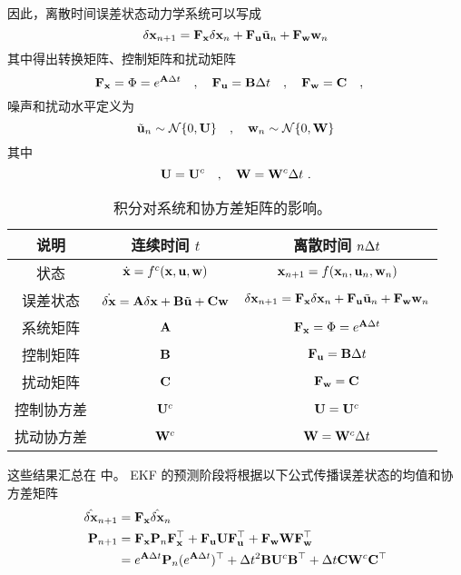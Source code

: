 %
因此，离散时间误差状态动力学系统可以写成
%
\begin{equation}
\delta{\bf x}_{n+1} = {\bf F}_{\bf x}\delta{\bf x}_n + {\bf F}_{\bf u}\tilde{{\bf u}}_n + {\bf F}_{\bf w} {\bf w}_n \label{equ:discTime}
\end{equation}
%
其中得出转换矩阵、控制矩阵和扰动矩阵
%
\begin{equation}
{\bf F}_{\bf x}=\Phi = e^{{\bf A}\Delta t} \quad , \quad {\bf F}_{\bf u}={\bf B}\Delta t \quad , \quad {\bf F}_{\bf w} = {\bf C} \quad , \quad 
\end{equation}
%
噪声和扰动水平定义为
%
\begin{equation}
\tilde{{\bf u}}_n\sim\mathcal{N}\{0,{\bf U}\} \quad , \quad {\bf w}_n\sim\mathcal{N}\{0,{\bf W}\} \label{equ:discMat}
\end{equation}
%
其中 
%
\begin{equation}
{\bf U} = {\bf U}^c \quad , \quad {\bf W} = {\bf W}^c\Delta t~. \label{equ:discCov}
\end{equation}
%
\begin{table*}
\renewcommand{\arraystretch}{1.3}
\caption{积分对系统和协方差矩阵的影响。}
\centering
\vspace{1ex}
\begin{tabular}{|c|c|c|}
\hline
说明 & 连续时间 $t$ & 离散时间 $n\Delta t$\\
\hline
\hline
状态 & $\dot{{\bf x}}=f^c({\bf x},{\bf u},{\bf w})$ & ${\bf x}_{n+1} = f({\bf x}_n,{\bf u}_n,{\bf w}_n)$ \\
误差状态 & $\dot{\delta{\bf x}}={\bf A}\delta{\bf x}+{\bf B}\tilde{{\bf u}}+{\bf C}{\bf w}$ & $\delta{\bf x}_{n+1}={\bf F}_{\bf x}\delta{\bf x}_n+{\bf F}_{\bf u}\tilde{{\bf u}}_n+{\bf F}_{\bf w}{\bf w}_n$ \\
\hline
系统矩阵 & ${\bf A}$ & ${\bf F}_{\bf x}=\Phi=e^{{\bf A}\Delta t}$ \\
控制矩阵 & ${\bf B}$ & ${\bf F}_{\bf u}={\bf B}\Delta t$ \\
扰动矩阵 & ${\bf C}$ & ${\bf F}_{\bf w}={\bf C}$ \\
\hline
控制协方差 & ${\bf U}^c$ & ${\bf U}={\bf U}^c$  \\
扰动协方差 & ${\bf W}^c$ & ${\bf W}={\bf W}^c\Delta t$  \\
\hline
\end{tabular}
\label{tab:IntEffects}
\end{table*}%

这些结果汇总在  中。
EKF 的预测阶段将根据以下公式传播误差状态的均值和协方差矩阵
%
\begin{align}
\hat{\delta{\bf x}}_{n+1} &= {\bf F}_{\bf x} \hat{\delta{\bf x}}_n \\
{\bf P}_{n+1} &= {\bf F}_{\bf x}{\bf P}_n{\bf F}_{\bf x}^{\top} + {\bf F}_{\bf u}{\bf U}{\bf F}_{\bf u}^{\top} + {\bf F}_{\bf w}{\bf W}{\bf F}_{\bf w}^{\top} \nonumber\\
&= e^{{\bf A}\Delta t}{\bf P}_n(e^{{\bf A}\Delta t})^{\top} + \Delta t^2{\bf B}{\bf U}^c{\bf B}^{\top} + \Delta t{\bf C}{\bf W}^c{\bf C}^{\top} \label{equ:NoisePertCovUpdate}
\end{align}

